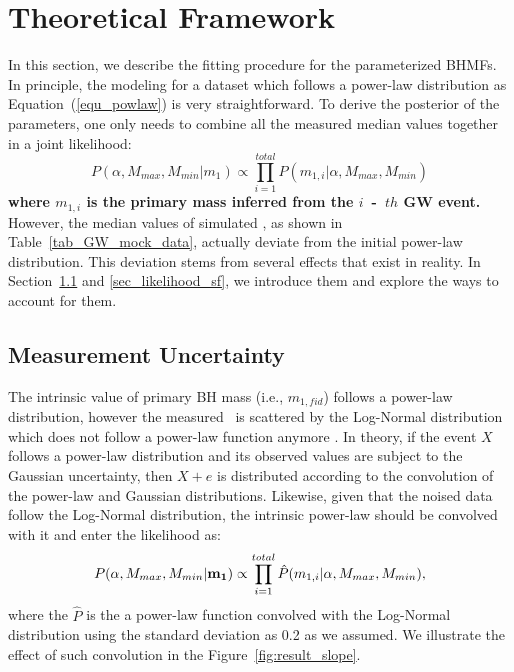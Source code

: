 \documentclass[twocolumn]{aastex62}
\begin{document}
\section{Theoretical Framework}  \label{sec_theory}
In this section, we describe the fitting procedure for the parameterized BHMFs. 
In principle, the modeling for a dataset which follows a power-law distribution as Equation~(\ref{equ_powlaw}) is very straightforward. To derive the posterior of the parameters, one only needs to combine all the measured median values together in a joint likelihood:
 \begin{equation} \label{equ_lik_powlaw}
 P(\alpha, M_{max}, M_{min}|m_{1}) \propto  \prod_{i=1}^{total} P(m_{1,i}|\alpha, M_{max}, M_{min})
 \end{equation}
 \textbf{where $m_{1,i}$ is the primary mass inferred from the $i$~-~$th$ GW event.}
However, the median values of simulated \mone, as shown in Table~\ref{tab_GW_mock_data}, actually deviate from the initial power-law distribution. This deviation stems from several effects that exist in reality. In Section~\ref{sec_likelihood_noise} and \ref{sec_likelihood_sf}, we introduce them and explore the ways to account for them.

\subsection{Measurement Uncertainty}\label{sec_likelihood_noise}
The intrinsic value of primary BH mass (i.e., $m_{1,fid}$) follows a power-law distribution, however the measured  \mone\ is scattered by the Log-Normal distribution which does not follow a power-law function anymore \citep{Koen2009}. In theory, if the event $X$ follows a power-law distribution and its observed values are subject to the Gaussian uncertainty, then $X + e$ is distributed according to the convolution of the power-law and Gaussian distributions. Likewise, given that the noised data follow the Log-Normal distribution, the intrinsic power-law should be convolved with it and enter the likelihood as:
 \begin{equation} \label{equ_lik_conv}
 P(\alpha, M_{max}, M_{min}{\bf |m_{1}}) \propto  \prod_{i=1}^{total} \hat{P}(m_{1,i}|\alpha, M_{max}, M_{min}),
 \end{equation}
where the $\hat{P}$ is the a power-law function convolved with the Log-Normal distribution using the standard deviation as 0.2 as we assumed. We illustrate the effect of such convolution in the Figure~\ref{fig:result_slope}.
\end{document}
